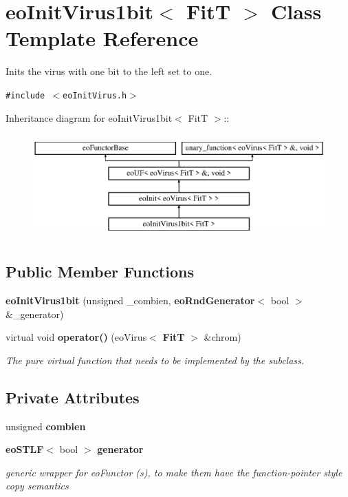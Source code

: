 \section{eo\-Init\-Virus1bit$<$ Fit\-T $>$ Class Template Reference}
\label{classeo_init_virus1bit}
Inits the virus with one bit to the left set to one.  


{\tt \#include $<$eo\-Init\-Virus.h$>$}

Inheritance diagram for eo\-Init\-Virus1bit$<$ Fit\-T $>$::\begin{figure}[H]
\begin{center}
\leavevmode
\includegraphics[height=4cm]{classeo_init_virus1bit}
\end{center}
\end{figure}
\subsection*{Public Member Functions}
\begin{CompactItemize}
\item 
{\bf eo\-Init\-Virus1bit} (unsigned \_\-combien, {\bf eo\-Rnd\-Generator}$<$ bool $>$ \&\_\-generator)\label{classeo_init_virus1bit_a0}

\item 
virtual void {\bf operator()} (eo\-Virus$<$ {\bf Fit\-T} $>$ \&chrom)\label{classeo_init_virus1bit_a1}

\begin{CompactList}\small\item\em The pure virtual function that needs to be implemented by the subclass. \item\end{CompactList}\end{CompactItemize}
\subsection*{Private Attributes}
\begin{CompactItemize}
\item 
unsigned {\bf combien}\label{classeo_init_virus1bit_r0}

\item 
{\bf eo\-STLF}$<$ bool $>$ {\bf generator}\label{classeo_init_virus1bit_r1}

\begin{CompactList}\small\item\em generic wrapper for eo\-Functor (s), to make them have the function-pointer style copy semantics \item\end{CompactList}\end{CompactItemize}


